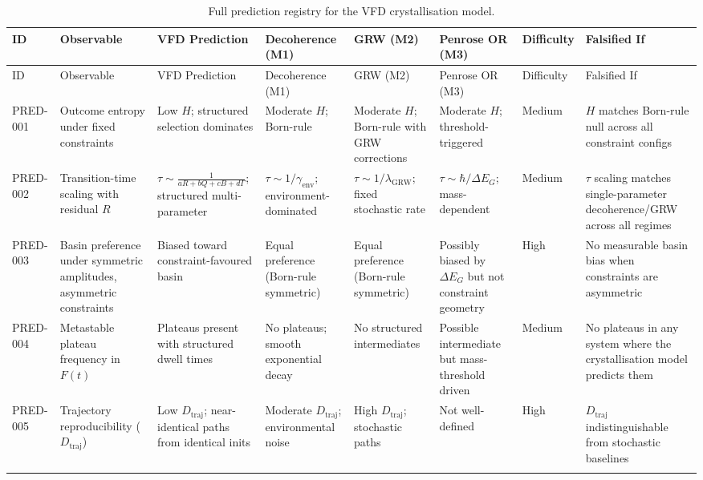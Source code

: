 \documentclass[12pt]{article}
\begin{document}
\begin{longtable}{@{}lp{2cm}p{2.2cm}p{2cm}p{1.8cm}p{1.8cm}p{1.5cm}p{2.2cm}@{}}
\caption{Full prediction registry for the VFD crystallisation model.} \label{tab:predictions} \\
\toprule
ID & Observable & VFD Prediction & Decoherence (M1) & GRW (M2) & Penrose OR (M3) & Difficulty & Falsified If \\
\midrule
\endfirsthead
\toprule
ID & Observable & VFD Prediction & Decoherence (M1) & GRW (M2) & Penrose OR (M3) & Difficulty & Falsified If \\
\midrule
\endhead
\bottomrule
\endfoot

PRED-001 & Outcome entropy under fixed constraints & Low $H$; structured selection dominates & Moderate $H$; Born-rule & Moderate $H$; Born-rule with GRW corrections & Moderate $H$; threshold-triggered & Medium & $H$ matches Born-rule null across all constraint configs \\
\addlinespace

PRED-002 & Transition-time scaling with residual $R$ & $\tau \sim \frac{1}{aR + bQ + cB + d\Gamma}$; structured multi-parameter & $\tau \sim 1/\gamma_{\mathrm{env}}$; environment-dominated & $\tau \sim 1/\lambda_{\mathrm{GRW}}$; fixed stochastic rate & $\tau \sim \hbar/\Delta E_G$; mass-dependent & Medium & $\tau$ scaling matches single-parameter decoherence/GRW across all regimes \\
\addlinespace

PRED-003 & Basin preference under symmetric amplitudes, asymmetric constraints & Biased toward constraint-favoured basin & Equal preference (Born-rule symmetric) & Equal preference (Born-rule symmetric) & Possibly biased by $\Delta E_G$ but not constraint geometry & High & No measurable basin bias when constraints are asymmetric \\
\addlinespace

PRED-004 & Metastable plateau frequency in $F(t)$ & Plateaus present with structured dwell times & No plateaus; smooth exponential decay & No structured intermediates & Possible intermediate but mass-threshold driven & Medium & No plateaus in any system where the crystallisation model predicts them \\
\addlinespace

PRED-005 & Trajectory reproducibility ($D_{\mathrm{traj}}$) & Low $D_{\mathrm{traj}}$; near-identical paths from identical inits & Moderate $D_{\mathrm{traj}}$; environmental noise & High $D_{\mathrm{traj}}$; stochastic paths & Not well-defined & High & $D_{\mathrm{traj}}$ indistinguishable from stochastic baselines \\
\addlinespace


\end{longtable}
\end{document}
